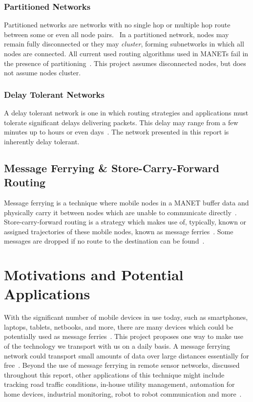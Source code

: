 \subsubsection{Partitioned Networks}
\label{sec:clustering}
Partitioned networks are networks with no single hop or multiple hop route between some or even all node pairs.~\cite{hybrid}
In a partitioned network, nodes may remain fully disconnected or they may \emph{cluster}, forming subnetworks in which all nodes are connected.
All current used routing algorithms used in MANETs %
fail in the presence of partitioning~\cite{Routing}.
This project assumes disconnected nodes, but does not assume nodes cluster.

\subsubsection{Delay Tolerant Networks}
\label{sec:delay_loss_tolerant}
A delay tolerant network is one in which routing strategies and applications must tolerate significant delays delivering packets.
This delay may range from a few minutes up to hours or even days~\cite{Routing}.
The network presented in this report is inherently delay tolerant.

\subsection{Message Ferrying \& Store-Carry-Forward Routing}
\label{sec:ferrying_overview}
Message ferrying is a technique where mobile nodes in a MANET buffer data and physically carry it between nodes which are unable to communicate directly~\cite{adhocmsgferry}.
Store-carry-forward routing is a strategy which makes use of, typically, known or assigned trajectories of these mobile nodes, known as message ferries~\cite{Routing}.
Some messages are dropped if no route to the destination can be found~\cite{implement}.

\section{Motivations and Potential Applications}
\label{sec:motivations}

With the significant number of mobile devices in use today, such as smartphones, laptops, tablets, netbooks, and more, there are many devices which could be potentially used as message ferries~\cite{wearable}.
This project proposes one way to make use of the technology we transport with us on a daily basis.
A message ferrying network could transport small amounts of data over large distances essentially for free~\cite{efficientrouting}.
Beyond the use of message ferrying in remote sensor networks, discussed throughout this report, other applications of this technique might include tracking road traffic conditions, in-house utility management, automation for home devices, industrial monitoring, robot to robot communication and more~\cite{book1}.

